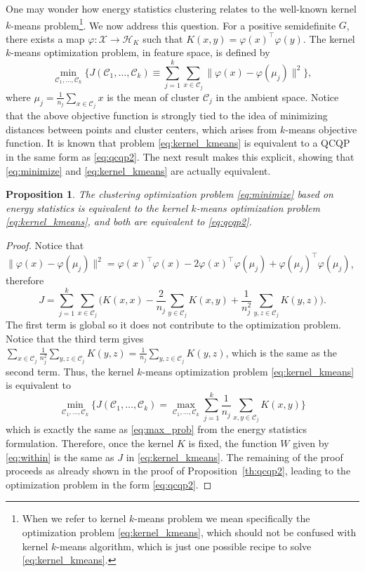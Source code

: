 \documentclass[aps,preprint,nofootinbib,floatfix]{revtex4-1}
\newtheorem{proposition}[theorem]{Proposition}
\newcommand\kk{K}
\newcommand\HH{\mathcal{H}}
\newcommand\C{{\mathcal{C}}}
\begin{document}
One may wonder how energy statistics clustering 
relates to the well-known kernel $k$-means problem\footnote{
When we refer to kernel $k$-means problem we mean specifically 
the optimization
problem \eqref{eq:kernel_kmeans}, which should not be confused with
kernel $k$-means algorithm, which is just one possible recipe to solve
\eqref{eq:kernel_kmeans}.}.
We now address this question.
For a positive semidefinite $G$, there exists a map
$\varphi: \mathcal{X} \to \HH_\kk$ such that
$\kk(x,y) = \varphi(x)^\top \varphi(y)$. The kernel $k$-means optimization
problem,
in feature space,
is defined by
\begin{equation}
\label{eq:kernel_kmeans}
\min_{\C_1,\dotsc,\C_k}\bigg\{ 
J(\C_1,\dots,\C_k) \equiv  \sum_{j=1}^k
\sum_{x \in \C_j} \| \varphi(x) - \varphi(\mu_j) \|^2
\bigg\},
\end{equation}
where $\mu_j = \tfrac{1}{n_j} \sum_{x \in \C_j} x$ is the  mean of cluster
$\C_j$ in the ambient space. Notice that the above objective function
is strongly tied to the idea of minimizing distances between points
and cluster centers, which arises from $k$-means objective function.
It is known \cite{Dhillon2,Dhillon} that problem \eqref{eq:kernel_kmeans} 
is equivalent to a QCQP in the same form as
\eqref{eq:qcqp2}. The next result makes this explicit, showing that
\eqref{eq:minimize} and \eqref{eq:kernel_kmeans} are actually equivalent.

\begin{proposition}
\label{th:kernel_kmeans}
The clustering optimization problem
\eqref{eq:minimize} based on energy statistics 
is equivalent to the kernel $k$-means optimization problem
\eqref{eq:kernel_kmeans}, and both are equivalent to \eqref{eq:qcqp2}.
\end{proposition}
\begin{proof}
Notice that $\| \varphi(x) - \varphi(\mu_j) \|^2 = \varphi(x)^\top \varphi(x)
- 2 \varphi(x)^\top \varphi(\mu_j) + \varphi(\mu_j)^\top \varphi(\mu_j)$,
therefore
\begin{equation}
\label{eq:J}
J = \sum_{j=1}^k \sum_{x\in\C_j} \bigg(
\kk(x,x) - 
\dfrac{2}{n_j} \sum_{y\in \C_j} \kk(x,y) + \dfrac{1}{n_j^2}
\sum_{y,z \in \C_j} \kk(y,z) \bigg).
\end{equation}
The first term is global so it does not contribute to the optimization
problem. Notice that the third term gives
$\sum_{x\in\C_j} \tfrac{1}{n_j^2} \sum_{y,z\in\C_j} \kk(y,z) =
\tfrac{1}{n_j}\sum_{y,z\in\C_j} \kk(y,z)$, which is the same as
the second term. Thus, the kernel $k$-means optimization problem
\eqref{eq:kernel_kmeans} is equivalent to
\begin{equation}
\min_{\C_1,\dotsc,\C_k} \bigg\{ J(\C_1,\dotsc,\C_k) = \max_{\C_1,\dotsc,\C_k}
\sum_{j=1}^k \dfrac{1}{n_j} \sum_{x,y \in\C_j} \kk(x,y) \bigg\}
\end{equation}
which is exactly the same as 
\eqref{eq:max_prob} from the energy statistics formulation. Therefore,
once the kernel $\kk$ is fixed, the function 
$W$ given by \eqref{eq:within} is the same
as $J$ in \eqref{eq:kernel_kmeans}.
The remaining of the proof proceeds as 
already shown in the proof of Proposition~\ref{th:qcqp2}, leading to
the optimization problem in the form \eqref{eq:qcqp2}.
\end{proof}
\end{document}
